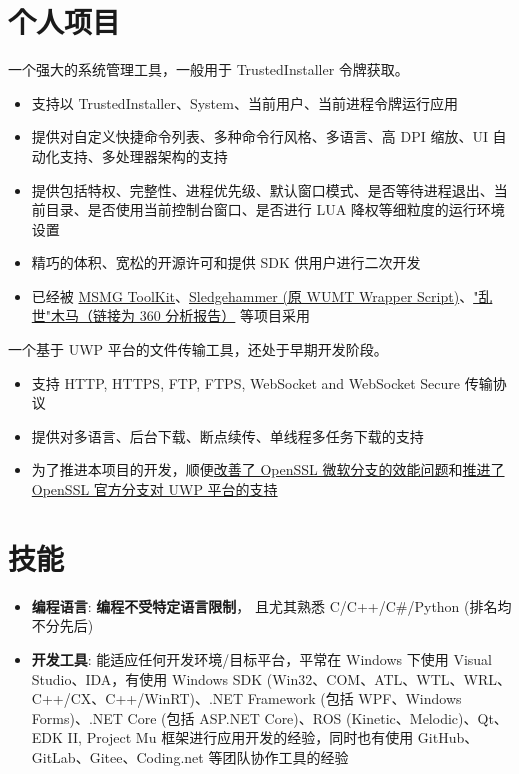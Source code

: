 \documentclass{resume}
\begin{document}
\section{个人项目}

一个强大的系统管理工具，一般用于 TrustedInstaller 令牌获取。
\begin{itemize}
  \item 支持以 TrustedInstaller、System、当前用户、当前进程令牌运行应用
  \item 提供对自定义快捷命令列表、多种命令行风格、多语言、高 DPI 缩放、UI 自动化支持、多处理器架构的支持
  \item 提供包括特权、完整性、进程优先级、默认窗口模式、是否等待进程退出、当前目录、是否使用当前控制台窗口、是否进行 LUA 降权等细粒度的运行环境设置
  \item 精巧的体积、宽松的开源许可和提供 SDK 供用户进行二次开发
  \item 已经被 \href{https://forums.mydigitallife.net/threads/50572/}{MSMG ToolKit}、\href{https://forums.mydigitallife.net/threads/72203/}{Sledgehammer (原 WUMT Wrapper Script)}、\href{http://www.360.cn/n/10477.html}{"乱世"木马（链接为 360 分析报告）} 等项目采用
\end{itemize}

一个基于 UWP 平台的文件传输工具，还处于早期开发阶段。
\begin{itemize}
  \item 支持 HTTP, HTTPS, FTP, FTPS, WebSocket and WebSocket Secure 传输协议
  \item 提供对多语言、后台下载、断点续传、单线程多任务下载的支持
  \item 为了推进本项目的开发，顺便\href{https://github.com/microsoft/openssl/pull/61}{改善了 OpenSSL 微软分支的效能问题}和\href{https://github.com/openssl/openssl/blob/42b3f10b5e461496aab1f74d24103d6902ebfcd5/CHANGES#L350}{推进了 OpenSSL 官方分支对 UWP 平台的支持}
\end{itemize}

\section{技能}
\begin{itemize}[parsep=0.25ex]

  \item \textbf{编程语言}:
    \textbf{编程不受特定语言限制}，
    且尤其熟悉 C/C++/C\#/Python (排名均不分先后)

  \item \textbf{开发工具}:
    能适应任何开发环境/目标平台，平常在 Windows 下使用 Visual Studio、IDA，有使用 Windows SDK (Win32、COM、ATL、WTL、WRL、C++/CX、C++/WinRT)、.NET Framework (包括 WPF、Windows Forms)、.NET Core (包括 ASP.NET Core)、ROS (Kinetic、Melodic)、Qt、EDK II, Project Mu 框架进行应用开发的经验，同时也有使用 GitHub、GitLab、Gitee、Coding.net 等团队协作工具的经验

\end{itemize}
\end{document}
